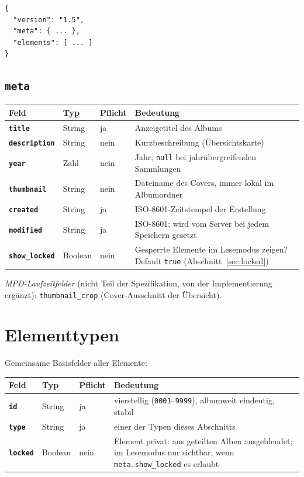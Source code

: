 \documentclass[11pt,a4paper]{article}
\let\mpdtt\texttt
\renewcommand{\texttt}[1]{\mpdtt{\textcolor{mpdred}{#1}}}
\newcommand{\feld}[1]{\mpdtt{\textbf{\textcolor{mpdred}{#1}}}}
\newcommand{\kopf}[1]{\textbf{#1}}
\begin{document}
\begin{lstlisting}
{
  "version": "1.5",
  "meta": { ... },
  "elements": [ ... ]
}
\end{lstlisting}

\subsection{\texttt{meta}}

\begin{tabularx}{\linewidth}{|l|l|l|L|}
\hline
{}\kopf{Feld} & \kopf{Typ} & \kopf{Pflicht} & \kopf{Bedeutung} \\
\hline
\feld{title} & String & ja & Anzeigetitel des Albums \\
\feld{description} & String & nein & Kurzbeschreibung (Übersichtskarte) \\
\feld{year} & Zahl & nein & Jahr; \texttt{null} bei jahrübergreifenden Sammlungen \\
\feld{thumbnail} & String & nein & Dateiname des Covers, immer lokal im Albumordner \\
\feld{created} & String & ja & ISO-8601-Zeitstempel der Erstellung \\
\feld{modified} & String & ja & ISO-8601; wird vom Server bei jedem Speichern gesetzt \\
\feld{show\_locked} & Boolean & nein & Gesperrte Elemente im Lesemodus zeigen? Default \texttt{true} (Abschnitt~\ref{sec:locked}) \\
\hline
\end{tabularx}

\emph{MPD-Laufzeitfelder} (nicht Teil der Spezifikation, von der
Implementierung ergänzt): \texttt{thumbnail\_crop} (Cover-Ausschnitt der
Übersicht).

\section{Elementtypen}

Gemeinsame Basisfelder aller Elemente:

\begin{tabularx}{\linewidth}{|l|l|l|L|}
\hline
{}\kopf{Feld} & \kopf{Typ} & \kopf{Pflicht} & \kopf{Bedeutung} \\
\hline
\feld{id} & String & ja & vierstellig (\texttt{0001}–\texttt{9999}), albumweit eindeutig, stabil \\
\feld{type} & String & ja & einer der Typen dieses Abschnitts \\
\feld{locked} & Boolean & nein & Element privat: aus geteilten Alben ausgeblendet; im Lesemodus nur sichtbar, wenn \texttt{meta.show\_locked} es erlaubt \\
\hline
\end{tabularx}
\end{document}
